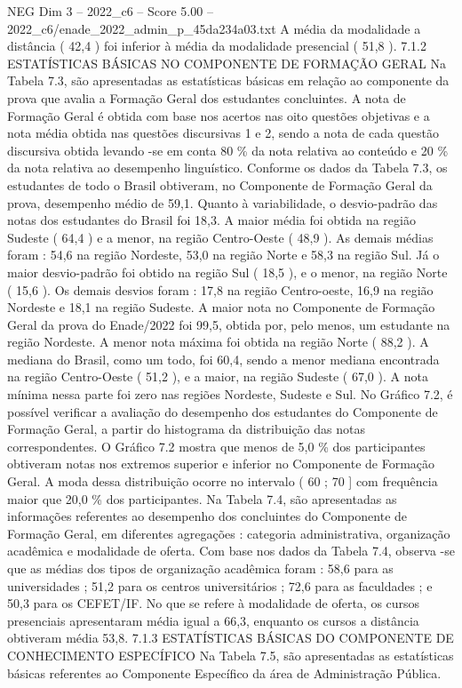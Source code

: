 \begin{textsample}{NEG Dim 3 – 2022\_c6 – Score 5.00 – 2022\_c6/enade\_2022\_admin\_p\_45da234a03.txt}
A média da modalidade a distância ( 42,4 ) foi inferior à média da modalidade presencial ( 51,8 ). 7.1.2 ESTATÍSTICAS BÁSICAS NO COMPONENTE DE FORMAÇÃO GERAL Na Tabela 7.3, são apresentadas as estatísticas básicas em relação ao componente da prova que avalia a Formação Geral dos estudantes concluintes.
A nota de Formação Geral é obtida com base nos acertos nas oito questões objetivas e a nota média obtida nas questões discursivas 1 e 2, sendo a nota de cada questão discursiva obtida levando -se em conta 80 \% da nota relativa ao conteúdo e 20 \% da nota relativa ao desempenho linguístico.
Conforme os dados da Tabela 7.3, os estudantes de todo o Brasil obtiveram, no Componente de Formação Geral da prova, desempenho médio de 59,1.
Quanto à variabilidade, o desvio-padrão das notas dos estudantes do Brasil foi 18,3.
A maior média foi obtida na região Sudeste ( 64,4 ) e a menor, na região Centro-Oeste ( 48,9 ).
As demais médias foram : 54,6 na região Nordeste, 53,0 na região Norte e 58,3 na região Sul.
Já o maior desvio-padrão foi obtido na região Sul ( 18,5 ), e o menor, na região Norte ( 15,6 ).
Os demais desvios foram : 17,8 na região Centro-oeste, 16,9 na região Nordeste e 18,1 na região Sudeste.
A maior nota no Componente de Formação Geral da prova do Enade/2022 foi 99,5, obtida por, pelo menos, um estudante na região Nordeste.
A menor nota máxima foi obtida na região Norte ( 88,2 ).
A mediana do Brasil, como um todo, foi 60,4, sendo a menor mediana encontrada na região Centro-Oeste ( 51,2 ), e a maior, na região Sudeste ( 67,0 ).
A nota mínima nessa parte foi zero nas regiões Nordeste, Sudeste e Sul.
No Gráfico 7.2, é possível verificar a avaliação do desempenho dos estudantes do Componente de Formação Geral, a partir do histograma da distribuição das notas correspondentes.
O Gráfico 7.2 mostra que menos de 5,0 \% dos participantes obtiveram notas nos extremos superior e inferior no Componente de Formação Geral.
A moda dessa distribuição ocorre no intervalo ( 60 ; 70 ] com frequência maior que 20,0 \% dos participantes.
Na Tabela 7.4, são apresentadas as informações referentes ao desempenho dos concluintes do Componente de Formação Geral, em diferentes agregações : categoria administrativa, organização acadêmica e modalidade de oferta.
Com base nos dados da Tabela 7.4, observa -se que as médias dos tipos de organização acadêmica foram : 58,6 para as universidades ; 51,2 para os centros universitários ; 72,6 para as faculdades ; e 50,3 para os CEFET/IF.
No que se refere à modalidade de oferta, os cursos presenciais apresentaram média igual a 66,3, enquanto os cursos a distância obtiveram média 53,8. 7.1.3 ESTATÍSTICAS BÁSICAS DO COMPONENTE DE CONHECIMENTO ESPECÍFICO Na Tabela 7.5, são apresentadas as estatísticas básicas referentes ao Componente Específico da área de Administração Pública.

\end{textsample}
